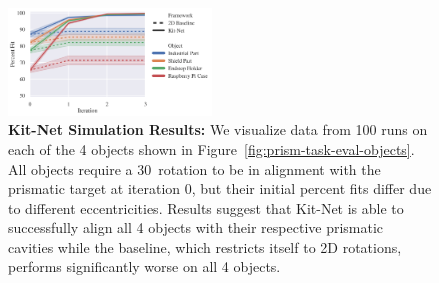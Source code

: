 \begin{figure}[t]
  \centering
  \vspace{8pt}
  \includegraphics[width=0.48\textwidth]{figures/percent_fit_controller_runs_v6.png}
  \caption{\textbf{Kit-Net Simulation Results: } We visualize data from 100 runs on each of the 4 objects shown in Figure~\ref{fig:prism-task-eval-objects}. All objects require a 30\degree~rotation to be in alignment with the prismatic target at iteration 0, but their initial percent fits differ due to different eccentricities. Results suggest that Kit-Net is able to successfully align all 4 objects with their respective prismatic cavities while the baseline, which restricts itself to 2D rotations, performs significantly worse on all 4 objects.}
  \label{fig:percent-fit-runs}
\end{figure}



